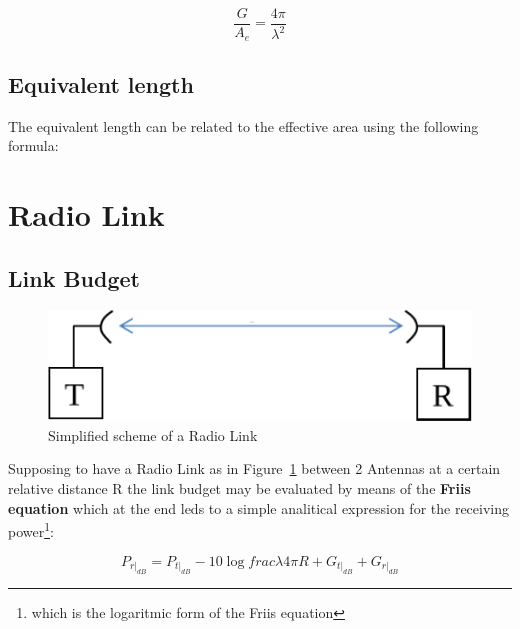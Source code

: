 \begin{equation}
	\frac{G}{A_e}=\frac{4 \pi }{\lambda^2}
\end{equation}



\subsection{Equivalent length} %
\label{sub:equivalent_length}

The equivalent length can be related to the effective area using the following formula:








\section{Radio Link} %
\label{sec:radio_link}


\subsection{Link Budget} %
\label{sub:link_budget}

\begin{figure}[h]
	\centering
	\includegraphics[scale=0.6]{Immagini/link}
	
	\caption{Simplified scheme of a Radio Link}
	\label{fig:link}
\end{figure}

Supposing to have a Radio Link as in Figure~\ref{fig:link} between 2 Antennas at a certain relative distance R the link budget may be evaluated by means of the \textbf{Friis equation} which at the end leds to a simple analitical expression for the receiving power\footnote{which is the logaritmic form of the Friis equation}:

\begin{equation}	
P_{r|_{dB}} = P_{t|_{dB}} - 10 \log{frac{\lambda}{4\pi R}} + G_{t|_{dB}} + G_{r|_{dB}} 
\end{equation}

